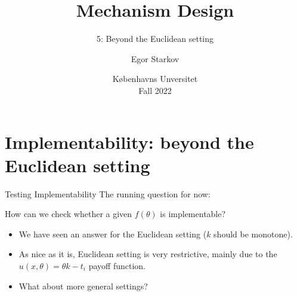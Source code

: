 \documentclass[english,10pt
,aspectratio=169
]{beamer}
\title{Mechanism Design}
\subtitle{5: Beyond the Euclidean setting}
\author{Egor Starkov}
\date{K{\o}benhavns Unversitet \\
	Fall 2022}
\begin{document}
	\frame[plain]{\titlepage}



\section{Implementability: beyond the Euclidean setting}

\begin{frame}{Testing Implementability}
	The running question for now:
	\begin{exampleblock}{}
		How can we check whether a given $f(\theta)$ is implementable?
	\end{exampleblock} 
	\begin{itemize}
		\item We have seen an answer for the Euclidean setting ($k$ should be monotone). 
		\item As nice as it is, Euclidean setting is very restrictive, mainly due to the $u(x,\theta)=\theta k - t_i$ payoff function.
		\item What about more general settings?
	\end{itemize}
\end{frame}


%		
\end{document}
